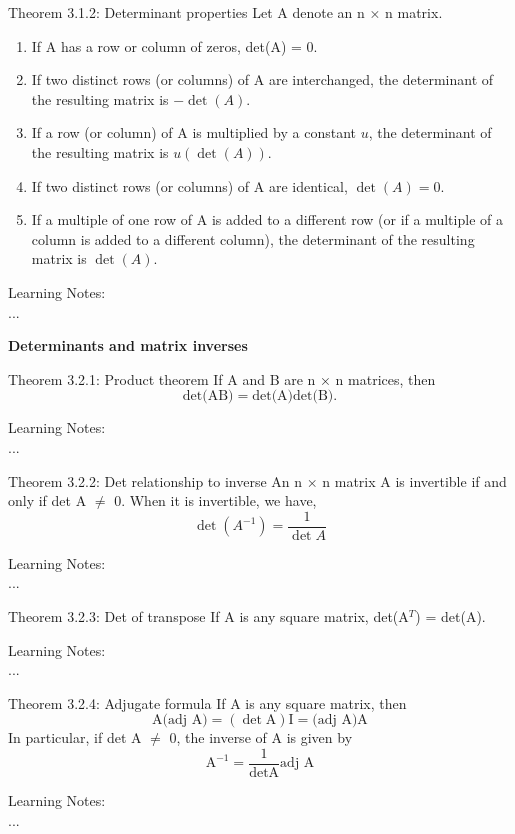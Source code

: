 \documentclass[
  12pt,
  a4paper,
]{article}
\begin{document}
\begin{box_cyan}{Theorem 3.1.2: Determinant properties}
Let A denote an n × n matrix. 
\begin{enumerate}
    \item If A has a row or column of zeros, det(A) = 0.
    \item If two distinct rows (or columns) of A are interchanged, the determinant of the resulting matrix is $-\det(A)$.
    \item If a row (or column) of A is multiplied by a constant $u$, the determinant of the resulting matrix is $u(\det(A))$.
    \item If two distinct rows (or columns) of A are identical, $\det(A)=0$.
    \item If a multiple of one row of A is added to a different row (or if a multiple of a column is added to a different column), the determinant of the resulting matrix is $\det(A)$.
\end{enumerate}
\end{box_cyan}
\noindent
Learning Notes:
\\...

\noindent
\textbf{Determinants and matrix inverses}

\begin{box_cyan}{Theorem 3.2.1: Product theorem}
If A and B are n × n matrices, then 
$$\text{det(AB)} = \text{det(A)} \text{det(B)}.$$
\end{box_cyan}
\noindent
Learning Notes:
\\...

\begin{box_cyan}{Theorem 3.2.2: Det relationship to inverse}
An n × n matrix A is invertible if and only if det A $\neq$ 0. When it is invertible, we have,
$$\det{\left(A^{-1}\right)=\frac{1}{\det{A}}}$$
\end{box_cyan}
\noindent
Learning Notes:
\\...

\begin{box_cyan}{Theorem 3.2.3: Det of transpose}
If A is any square matrix, det(A$^T$) = det(A).
\end{box_cyan}
\noindent
Learning Notes:
\\...

\begin{box_cyan}{Theorem 3.2.4: Adjugate formula}
If A is any square matrix, then
$$\text{A(adj A)} = (\det{\text{A}})\text{I} = \text{(adj A)A}$$
In particular, if det A $\neq$ 0, the inverse of A is given by
$$\text{A}^{-1}=\frac{1}{\det{\text{A}}}\text{adj A}$$
\end{box_cyan}
\noindent
Learning Notes:
\\...
\end{document}

